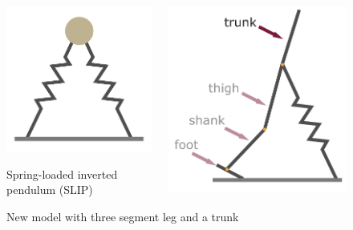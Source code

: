 \documentclass[10pt]{beamer}
\begin{document}
\begin{frame}
\begin{figure}
\begin{overprint}
				\centering
				\begin{columns}
					\begin{column}{.5\textwidth}
						\centering
						\includegraphics[height=.5\textheight]{images/slip/double_SLIP.pdf}
						\caption{Spring-loaded inverted pendulum (SLIP)}				
					\end{column}
					\begin{column}{.5\textwidth}
						\centering
						\includegraphics[height=.5\textheight]{images/new_model/left_3leg_trunk.pdf} 
						\caption{New model with three segment leg and a trunk}
					\end{column}	
				\end{columns}	
				

\end{overprint}
\end{figure}
\end{frame}
\end{document}

